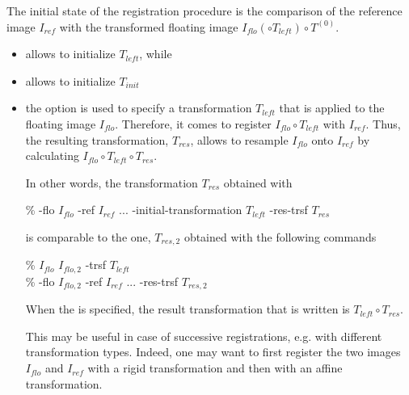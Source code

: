 The initial state of the registration procedure is the
comparison of the reference image $I_{ref}$ with the transformed
floating  image $I_{flo} \left( \circ T_{left} \right) \circ T^{(0)}$.
\begin{itemize}
\item[]  allows to initialize $T_{left}$, while
\item[]  allows to initialize $T_{init}$
\end{itemize}

\begin{itemize}

\item the option  is
  used to specify a transformation $T_{left}$ that is applied to the
  floating image $I_{flo}$. Therefore, it comes to register $I_{flo}
  \circ T_{left}$ with $I_{ref}$. Thus, the resulting transformation,
  $T_{res}$, allows to resample $I_{flo}$ onto $I_{ref}$ by
  calculating $I_{flo} \circ T_{left} \circ T_{res}$.

In other words, the transformation $T_{res}$ obtained with
\begin{code}{1}
\% \blockmatching -flo $I_{flo}$ -ref $I_{ref}$ ... -initial-transformation $T_{left}$  -res-trsf $T_{res}$
\end{code}
is comparable to the one, $T_{res,2}$ obtained with the following commands
\begin{code}{1}
\% \applyTrsf $I_{flo}$ $I_{flo,2}$ -trsf $T_{left}$ \\
\% \blockmatching -flo $I_{flo,2}$ -ref $I_{ref}$ ... -res-trsf $T_{res,2}$
\end{code}

\begin{note}
When the  is specified, the
result transformation that is written is $T_{left} \circ T_{res}$. 
\end{note}

This may be useful in case of successive registrations, e.g. with
different transformation types. Indeed, one may want to first register
the two images $I_{flo}$ and $I_{ref}$ with a rigid transformation and
then with an affine transformation.


\end{itemize}
